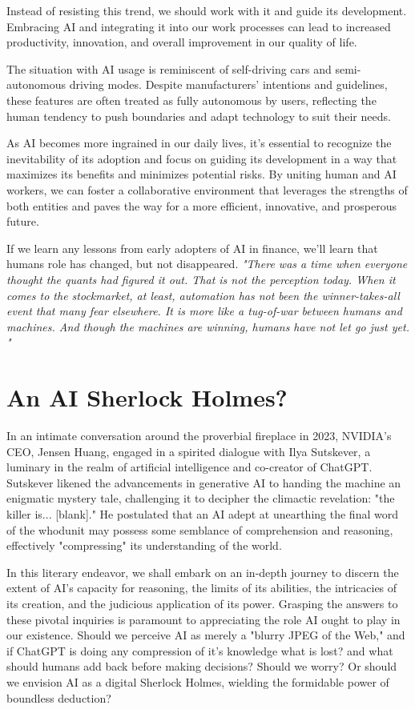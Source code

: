 Instead of resisting this trend, we should work with it and guide its development. Embracing AI and integrating it into our work processes can lead to increased productivity, innovation, and overall improvement in our quality of life.

The situation with AI usage is reminiscent of self-driving cars and semi-autonomous driving modes. Despite manufacturers' intentions and guidelines, these features are often treated as fully autonomous by users, reflecting the human tendency to push boundaries and adapt technology to suit their needs.

As AI becomes more ingrained in our daily lives, it's essential to recognize the inevitability of its adoption and focus on guiding its development in a way that maximizes its benefits and minimizes potential risks. By uniting human and AI workers, we can foster a collaborative environment that leverages the strengths of both entities and paves the way for a more efficient, innovative, and prosperous future. 

If we learn any lessons from early adopters of AI in finance, we'll learn that humans role has changed, but not disappeared. \textit{"There was a time when everyone thought the quants had figured it out. That is not the perception today. When it comes to the stockmarket, at least, automation has not been the winner-takes-all event that many fear elsewhere. It is more like a tug-of-war between humans and machines. And though the machines are winning, humans have not let go just yet. "} 

\section {An AI Sherlock Holmes?}

In an intimate conversation around the proverbial fireplace in 2023, NVIDIA's CEO, Jensen Huang, engaged in a spirited dialogue with Ilya Sutskever, a luminary in the realm of artificial intelligence and co-creator of ChatGPT. Sutskever likened the advancements in generative AI to handing the machine an enigmatic mystery tale, challenging it to decipher the climactic revelation: "the killer is... [blank]." He postulated that an AI adept at unearthing the final word of the whodunit may possess some semblance of comprehension and reasoning, effectively "compressing" its understanding of the world.

In this literary endeavor, we shall embark on an in-depth journey to discern the extent of AI's capacity for reasoning, the limits of its abilities, the intricacies of its creation, and the judicious application of its power. Grasping the answers to these pivotal inquiries is paramount to appreciating the role AI ought to play in our existence. Should we perceive AI as merely a "blurry JPEG of the Web," and if ChatGPT is doing any compression of it's knowledge what is lost? and what should humans add back before making decisions? Should we worry? Or should we envision AI as a digital Sherlock Holmes, wielding the formidable power of boundless deduction?

